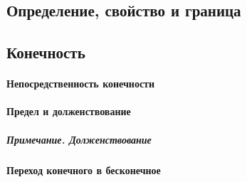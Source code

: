\documentclass[12pt, openany]{memoir}
\begin{document}

% 


% 


% 

\subsection{Определение, свойство и граница}



\subsection{Конечность}



\paragraph{Непосредственность конечности}



\paragraph{Предел и долженствование}



\subparagraph{Примечание. Долженствование}



\paragraph{Переход конечного в бесконечное}




\printendnotes
\end{document}
